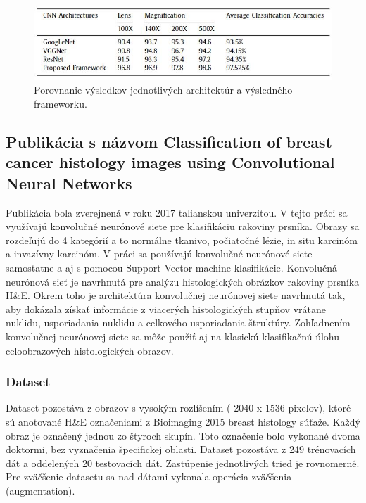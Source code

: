 \begin{figure}[h!]
\begin{centering}
\includegraphics[width=15cm]{assets/images/251_2.JPG}
\par\end{centering}
\caption{Porovnanie výsledkov jednotlivých architektúr a výsledného frameworku. \label{fig:dynabook}\cite{KHAN20191}}
\end{figure}


\subsection{Publikácia s názvom Classification of  breast cancer histology images using Convolutional Neural Networks}

\hspace{10mm}Publikácia bola zverejnená v roku 2017 talianskou univerzitou.  V  tejto práci sa využívajú konvolučné neurónové siete pre klasifikáciu rakoviny prsníka. Obrazy sa rozdeľujú do 4 kategórií a to normálne tkanivo, počiatočné lézie, in situ karcinóm a invazívny karcinóm. V práci sa používajú konvolučné neurónové siete samostatne a aj s pomocou Support Vector machine klasifikácie. Konvolučná neurónová sieť je navrhnutá pre analýzu histologických obrázkov rakoviny prsníka H\&E. Okrem toho je architektúra konvolučnej neurónovej siete navrhnutá tak, aby dokázala získať informácie z viacerých histologických stupňov vrátane nuklidu, usporiadania nuklidu  a celkového usporiadania štruktúry. Zohľadnením  konvolučnej neurónovej siete sa môže použiť aj na klasickú klasifikačnú úlohu celoobrazových histologických obrazov.

\subsubsection*{Dataset}
\hspace{10mm}Dataset pozostáva z obrazov s vysokým rozlíšením ( 2040 x 1536 pixelov), ktoré sú anotované H\&E označeniami z Bioimaging 2015 breast histology súťaže. Každý obraz je označený jednou zo štyroch skupín. Toto označenie bolo vykonané dvoma doktormi, bez vyznačenia špecifickej oblasti. Dataset pozostáva z 249 trénovacích dát a oddelených 20 testovacích dát. Zastúpenie jednotlivých tried je rovnomerné. Pre zväčšenie datasetu sa nad dátami vykonala operácia zväčšenia (augmentation).
 

